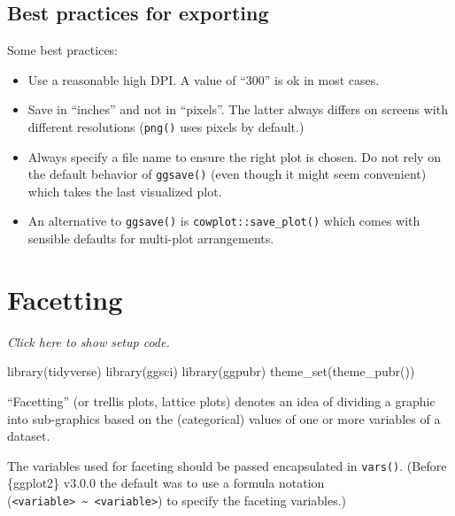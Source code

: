 \documentclass[]{book}
\newenvironment{Shaded}{}{}
\newcommand{\KeywordTok}[1]{\textcolor[rgb]{0.00,0.00,1.00}{#1}}
\newcommand{\NormalTok}[1]{#1}
\begin{document}
\hypertarget{best-practices-for-exporting}{%
\subsection{Best practices for exporting}\label{best-practices-for-exporting}}

Some best practices:

\begin{itemize}
\item
  Use a reasonable high DPI. A value of ``300'' is ok in most cases.
\item
  Save in ``inches'' and not in ``pixels''. The latter always differs on screens with different resolutions (\texttt{png()} uses pixels by default.)
\item
  Always specify a file name to ensure the right plot is chosen. Do not rely on the default behavior of \texttt{ggsave()} (even though it might seem convenient) which takes the last visualized plot.
\item
  An alternative to \texttt{ggsave()} is \texttt{cowplot::save\_plot()} which comes with sensible defaults for multi-plot arrangements.
\end{itemize}

\hypertarget{facetting}{%
\section{Facetting}\label{facetting}}

\emph{Click here to show setup code.}

\begin{Shaded}
\begin{Highlighting}[]
\KeywordTok{library}\NormalTok{(tidyverse)}
\KeywordTok{library}\NormalTok{(ggsci)}
\KeywordTok{library}\NormalTok{(ggpubr)}
\KeywordTok{theme_set}\NormalTok{(}\KeywordTok{theme_pubr}\NormalTok{())}
\end{Highlighting}
\end{Shaded}

``Facetting'' (or trellis plots, lattice plots) denotes an idea of dividing a graphic into sub-graphics based on the (categorical) values of one or more variables of a dataset.

The variables used for faceting should be passed encapsulated in \texttt{vars()}.
(Before \{ggplot2\} v3.0.0 the default was to use a formula notation (\texttt{\textless{}variable\textgreater{}\ \textasciitilde{}\ \textless{}variable\textgreater{}}) to specify the faceting variables.)
\end{document}
